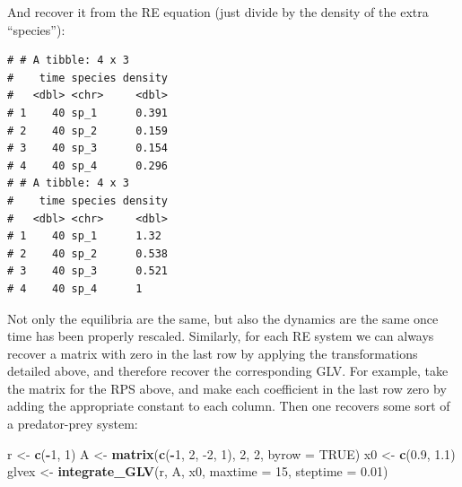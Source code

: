 \documentclass[]{book}
\newenvironment{Shaded}{\begin{snugshade}}{\end{snugshade}}
\newcommand{\DataTypeTok}[1]{\textcolor[rgb]{0.13,0.29,0.53}{#1}}
\newcommand{\DecValTok}[1]{\textcolor[rgb]{0.00,0.00,0.81}{#1}}
\newcommand{\FloatTok}[1]{\textcolor[rgb]{0.00,0.00,0.81}{#1}}
\newcommand{\KeywordTok}[1]{\textcolor[rgb]{0.13,0.29,0.53}{\textbf{#1}}}
\newcommand{\NormalTok}[1]{#1}
\newcommand{\OperatorTok}[1]{\textcolor[rgb]{0.81,0.36,0.00}{\textbf{#1}}}
\newcommand{\OtherTok}[1]{\textcolor[rgb]{0.56,0.35,0.01}{#1}}
\newcommand{\StringTok}[1]{\textcolor[rgb]{0.31,0.60,0.02}{#1}}
\begin{document}
And recover it from the RE equation (just divide by the density of the extra ``species''):

\begin{Shaded}
\end{Shaded}

\begin{verbatim}
# # A tibble: 4 x 3
#    time species density
#   <dbl> <chr>     <dbl>
# 1    40 sp_1      0.391
# 2    40 sp_2      0.159
# 3    40 sp_3      0.154
# 4    40 sp_4      0.296
# # A tibble: 4 x 3
#    time species density
#   <dbl> <chr>     <dbl>
# 1    40 sp_1      1.32 
# 2    40 sp_2      0.538
# 3    40 sp_3      0.521
# 4    40 sp_4      1
\end{verbatim}

Not only the equilibria are the same, but also the dynamics are the same once time has been properly rescaled. Similarly, for each RE system we can always recover a matrix with zero in the last row by applying the transformations detailed above, and therefore recover the corresponding GLV. For example, take the matrix for the RPS above, and make each coefficient in the last row zero by adding the appropriate constant to each column. Then one recovers some sort of a predator-prey system:

\begin{Shaded}
\begin{Highlighting}[]
\NormalTok{r <-}\StringTok{ }\KeywordTok{c}\NormalTok{(}\OperatorTok{-}\DecValTok{1}\NormalTok{, }\DecValTok{1}\NormalTok{)}
\NormalTok{A <-}\StringTok{ }\KeywordTok{matrix}\NormalTok{(}\KeywordTok{c}\NormalTok{(}\OperatorTok{-}\DecValTok{1}\NormalTok{, }\DecValTok{2}\NormalTok{,}
              \DecValTok{-2}\NormalTok{, }\DecValTok{1}\NormalTok{), }\DecValTok{2}\NormalTok{, }\DecValTok{2}\NormalTok{, }\DataTypeTok{byrow =} \OtherTok{TRUE}\NormalTok{)}
\NormalTok{x0 <-}\StringTok{ }\KeywordTok{c}\NormalTok{(}\FloatTok{0.9}\NormalTok{, }\FloatTok{1.1}\NormalTok{)}
\NormalTok{glvex <-}\StringTok{ }\KeywordTok{integrate_GLV}\NormalTok{(r, A, x0, }\DataTypeTok{maxtime =} \DecValTok{15}\NormalTok{, }\DataTypeTok{steptime =} \FloatTok{0.01}\NormalTok{)}
\end{Highlighting}
\end{Shaded}
\end{document}
